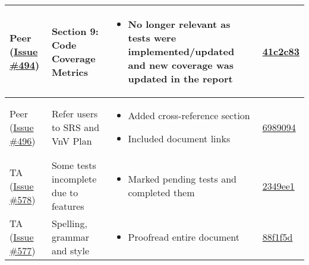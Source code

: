 \documentclass{article}
\begin{document}
\begin{longtable}{|p{2cm}|p{3.5cm}|p{4.5cm}|p{3cm}|}
    Peer (\href{https://github.com/ssm-lab/capstone--source-code-optimizer/issues/494}{Issue \#494}) & 
    Section 9: Code Coverage Metrics &
    \begin{itemize}[nosep,leftmargin=*]
        \item No longer relevant as tests were implemented/updated and new coverage was updated in the report
    \end{itemize} &
    \href{https://github.com/ssm-lab/capstone--source-code-optimizer/commit/41c2c837f4fcd0df130ba5d0fdac084248224494}{41c2c83} \\
    \hline
    
    Peer (\href{https://github.com/ssm-lab/capstone--source-code-optimizer/issues/496}{Issue \#496}) & 
    Refer users to SRS and VnV Plan &
    \begin{itemize}[nosep,leftmargin=*]
        \item Added cross-reference section
        \item Included document links
    \end{itemize} &
    \href{https://github.com/ssm-lab/capstone--source-code-optimizer/commit/6989094e5c0762cf7f3becd5f69a7d91701c1c54}{6989094} \\
    \hline
    
    TA (\href{https://github.com/ssm-lab/capstone--source-code-optimizer/issues/578}{Issue \#578}) & 
    Some tests incomplete due to features &
    \begin{itemize}[nosep,leftmargin=*]
        \item Marked pending tests and completed them
    \end{itemize} &
    \href{https://github.com/ssm-lab/capstone--source-code-optimizer/commit/2349ee1ce6a5f635fc2c1701a1b638bf4b155521}{2349ee1} \\
    \hline
    
    TA (\href{https://github.com/ssm-lab/capstone--source-code-optimizer/issues/577}{Issue \#577}) & 
    Spelling, grammar and style &
    \begin{itemize}[nosep,leftmargin=*]
        \item Proofread entire document
    \end{itemize} &
    \href{https://github.com/ssm-lab/capstone--source-code-optimizer/commit/88f1f5d607ee781e9725c3d2fa78ef70782d44a8}{88f1f5d} \\
    \hline
    
\end{longtable}
\end{document}
